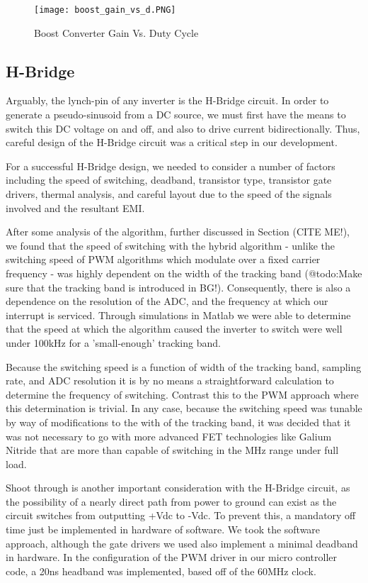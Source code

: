 \begin{figure}
\centering
\texttt{[image: boost\_gain\_vs\_d.PNG]}
\caption{Boost Converter Gain Vs. Duty Cycle}
\label{Boost Converter Gain Vs. Duty Cycle}
\end{figure}



\subsection{H-Bridge}
Arguably, the lynch-pin of any inverter is the H-Bridge circuit. In order to generate a pseudo-sinusoid from a DC source, we must first have the means to switch this DC voltage on and off, and also to drive current bidirectionally. Thus, careful design of the H-Bridge circuit was a critical step in our development.

For a successful H-Bridge design, we needed to consider a number of factors including the speed of switching, deadband, transistor type, transistor gate drivers, thermal analysis, and careful layout due to the speed of the signals involved and the resultant EMI.

After some analysis of the algorithm, further discussed in Section (CITE ME!), we found that the speed of switching with the hybrid algorithm - unlike the switching speed of PWM algorithms which modulate over a fixed carrier frequency - was highly dependent on the width of the tracking band (@todo:Make sure that the tracking band is introduced in BG!). Consequently, there is also a dependence on the resolution of the ADC, and the frequency at which our interrupt is serviced. Through simulations in Matlab we were able to determine that the speed at which the algorithm caused the inverter to switch were well under 100kHz for a 'small-enough' tracking band. 

Because the switching speed is a function of width of the tracking band, sampling rate, and ADC resolution it is by no means a straightforward calculation to determine the frequency of switching. Contrast this to the PWM approach where this determination is trivial. In any case, because the switching speed was tunable by way of modifications to the with of the tracking band, it was decided that it was not necessary to go with more advanced FET technologies like Galium Nitride that are more than capable of switching in the MHz range under full load. 

Shoot through is another important consideration with the H-Bridge circuit, as the possibility of a nearly direct path from power to ground can exist as the circuit switches from outputting +Vdc to -Vdc. To prevent this, a mandatory off time just be implemented in hardware of software. We took the software approach, although the gate drivers we used also implement a minimal deadband in hardware. In the configuration of the PWM driver in our micro controller code, a 20ns headband was implemented, based off of the 60MHz clock.

